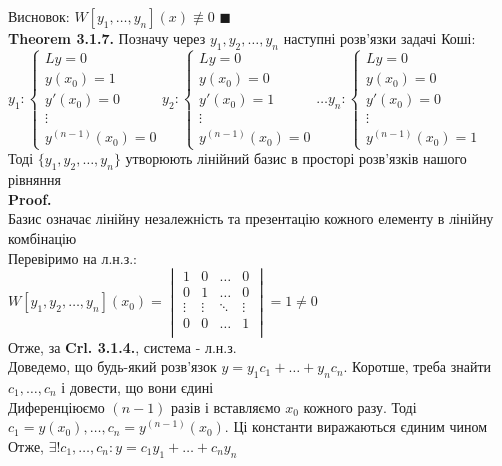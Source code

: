 \documentclass[a4paper, 14pt]{extarticle}
\def\huge{\displaystyle}
\def\th#1{\textbf{Theorem {#1}}}
\def\proof{\textbf{Proof.}\\}
\def\bigline{\vspace{5mm}\\}
\def\qed{$\blacksquare$}
\begin{document}
Висновок: $W[y_1, \dots, y_n](x) \not\equiv 0$ \qed
\bigline
\th{3.1.7.} Позначу через $y_1, y_2, \dots, y_n$ наступні розв'язки задачі Коші:\\
$y_1:
\begin{cases}
 Ly = 0\\
 y(x_0) = 1 \\
 y'(x_0) = 0 \\
 \vdots \\
 y^{(n-1)}(x_0) = 0
\end{cases}
y_2:
\begin{cases}
 Ly = 0\\
 y(x_0) = 0 \\
 y'(x_0) = 1 \\
 \vdots \\
 y^{(n-1)}(x_0) = 0
\end{cases}
\dots
y_n:
\begin{cases}
 Ly = 0\\
 y(x_0) = 0 \\
 y'(x_0) = 0 \\
 \vdots \\
 y^{(n-1)}(x_0) = 1
\end{cases}
$\\
Тоді $\{y_1, y_2, \dots, y_n\}$ утворюють лінійний базис в просторі розв'язків нашого рівняння\\
\proof
Базис означає лінійну незалежність та презентацію кожного елементу в лінійну комбінацію\\
Перевіримо на л.н.з.:\\
$\huge W[y_1, y_2, \dots, y_n](x_0) = 
\begin{vmatrix} 
	1 &  0 & \dots & 0 \\ 
	0 &  1 & \dots & 0 \\
	\vdots &  \vdots & \ddots & \vdots \\
	0 &  0 & \dots & 1 \\
\end{vmatrix} = 1 \neq 0$\\Отже, за \textbf{Crl. 3.1.4.}, система - л.н.з.
\\
Доведемо, що будь-який розв'язок $y = y_1c_1 + \dots + y_n c_n$. Коротше, треба знайти $c_1, \dots, c_n$ і довести, що вони єдині\\
Диференціюємо $(n-1)$ разів і вставляємо $x_0$ кожного разу. Тоді\\
$c_1 = y(x_0), \dots, c_n=y^{(n-1)}(x_0)$. Ці константи виражаються єдиним чином\\
Отже, $\exists! c_1,\dots,c_n: y = c_1 y_1 + \dots + c_n y_n$\\
\end{document}
